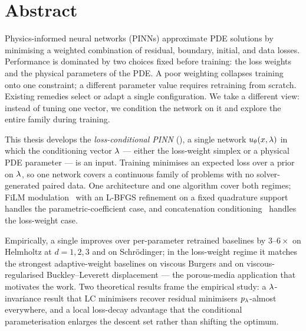 \documentclass[12pt,a4paper]{extarticle}
\begin{document}
\makeTitlePage

\setcounter{page}{2}

{\hypersetup{linkcolor=black}
\renewcommand{\contentsname}{Contents}
\tableofcontents
}

\newpage

\section*{Abstract}

Physics-informed neural networks (PINNs) approximate PDE solutions by minimising a weighted combination of residual, boundary, initial, and data losses. Performance is dominated by two choices fixed before training: the loss weights and the physical parameters of the PDE. A poor weighting collapses training onto one constraint; a different parameter value requires retraining from scratch. Existing remedies select or adapt a single configuration. We take a different view: instead of tuning one vector, we condition the network on it and explore the entire family during training.

This thesis develops the \emph{loss-conditional PINN} (\LCPINN{}), a single network $u_\theta(x, \lambda)$ in which the conditioning vector $\lambda$ --- either the loss-weight simplex or a physical PDE parameter --- is an input. Training minimises an expected loss over a prior on $\lambda$, so one network covers a continuous family of problems with no solver-generated paired data. One architecture and one algorithm cover both regimes; FiLM modulation~\cite{perez2018film} with an L-BFGS refinement on a fixed quadrature support handles the parametric-coefficient case, and concatenation conditioning~\cite{dosovitskiy2020} handles the loss-weight case.

Empirically, a single \LCPINN{} improves over per-parameter retrained baselines by $3$--$6\times$ on Helmholtz at $d = 1, 2, 3$ and on Schr\"{o}dinger; in the loss-weight regime it matches the strongest adaptive-weight baselines on viscous Burgers and on viscous-regularised Buckley--Leverett displacement --- the porous-media application that motivates the work. Two theoretical results frame the empirical study: a $\lambda$-invariance result that LC minimisers recover residual minimisers $p_\lambda$-almost everywhere, and a local loss-decay advantage that the conditional parameterisation enlarges the descent set rather than shifting the optimum.
\end{document}
